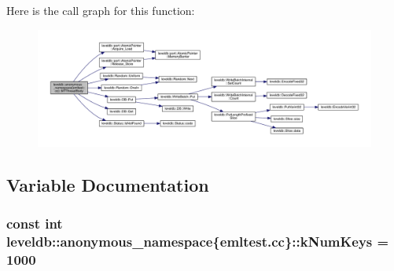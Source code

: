 Here is the call graph for this function\+:
\nopagebreak
\begin{figure}[H]
\begin{center}
\leavevmode
\includegraphics[width=350pt]{namespaceleveldb_1_1anonymous__namespace_02emltest_8cc_03_aa224d0d02af25c4bd7e2d3c550a82c7a_cgraph}
\end{center}
\end{figure}




\subsection{Variable Documentation}
\hypertarget{namespaceleveldb_1_1anonymous__namespace_02emltest_8cc_03_abf454747366343aa19b1683189417f28}{}
\subsubsection[{k\+Num\+Keys}]{\setlength{\rightskip}{0pt plus 5cm}const int leveldb\+::anonymous\+\_\+namespace\{emltest.\+cc\}\+::k\+Num\+Keys = 1000\hspace{0.3cm}{\ttfamily [static]}}\label{namespaceleveldb_1_1anonymous__namespace_02emltest_8cc_03_abf454747366343aa19b1683189417f28}
\hypertarget{namespaceleveldb_1_1anonymous__namespace_02emltest_8cc_03_a26fa4b352f376c5bc4b01fdda6123d79}{}
